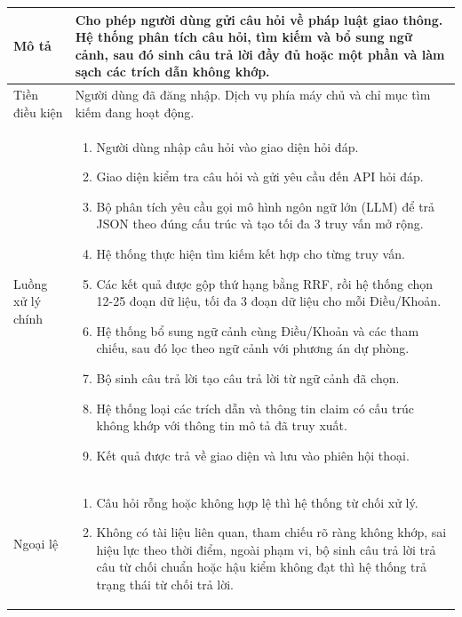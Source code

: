 \documentclass[12pt,a4paper,oneside]{report}
\begin{document}
{\begin{longtable}{|L{3.6cm}|L{11.2cm}|}
    \hline
    Mô tả               & Cho phép người dùng gửi câu hỏi về pháp luật giao thông. Hệ thống phân tích câu hỏi, tìm kiếm và bổ sung ngữ cảnh, sau đó sinh câu trả lời đầy đủ hoặc một phần và làm sạch các trích dẫn không khớp.                       \\
    \hline
    Tiền điều kiện      & Người dùng đã đăng nhập. Dịch vụ phía máy chủ và chỉ mục tìm kiếm đang hoạt động.                                                                                                                                           \\
    \hline
    Luồng xử lý chính   & \begin{enumerate}[leftmargin=*,nosep]
                            \item Người dùng nhập câu hỏi vào giao diện hỏi đáp.
                            \item Giao diện kiểm tra câu hỏi và gửi yêu cầu đến API hỏi đáp.
                            \item Bộ phân tích yêu cầu gọi mô hình ngôn ngữ lớn (LLM) để trả JSON theo đúng cấu trúc và tạo tối đa 3 truy vấn mở rộng.
                            \item Hệ thống thực hiện tìm kiếm kết hợp cho từng truy vấn.
                            \item Các kết quả được gộp thứ hạng bằng RRF, rồi hệ thống chọn 12-25 đoạn dữ liệu, tối đa 3 đoạn dữ liệu cho mỗi Điều/Khoản.
                            \item Hệ thống bổ sung ngữ cảnh cùng Điều/Khoản và các tham chiếu, sau đó lọc theo ngữ cảnh với phương án dự phòng.
                            \item Bộ sinh câu trả lời tạo câu trả lời từ ngữ cảnh đã chọn.
                            \item Hệ thống loại các trích dẫn và thông tin claim có cấu trúc không khớp với thông tin mô tả đã truy xuất.
                            \item Kết quả được trả về giao diện và lưu vào phiên hội thoại.
                          \end{enumerate}                                                                                                \\
    \hline
    Ngoại lệ            & \begin{enumerate}[leftmargin=*,nosep]
                            \item Câu hỏi rỗng hoặc không hợp lệ thì hệ thống từ chối xử lý.
                            \item Không có tài liệu liên quan, tham chiếu rõ ràng không khớp, sai hiệu lực theo thời điểm, ngoài phạm vi, bộ sinh câu trả lời trả câu từ chối chuẩn hoặc hậu kiểm không đạt thì hệ thống trả trạng thái từ chối trả lời.

\end{enumerate}
\end{longtable}}
\end{document}
